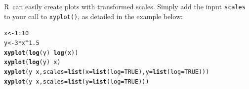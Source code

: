 \documentclass[twoside]{book}\usepackage[]{graphicx}\usepackage[]{xcolor}
\makeatletter
\newcommand{\hlnum}[1]{\textcolor[rgb]{0.686,0.059,0.569}{#1}}%
\newcommand{\hlopt}[1]{\textcolor[rgb]{0,0,0}{#1}}%
\newcommand{\hlstd}[1]{\textcolor[rgb]{0.345,0.345,0.345}{#1}}%
\newcommand{\hlkwb}[1]{\textcolor[rgb]{0.69,0.353,0.396}{#1}}%
\newcommand{\hlkwc}[1]{\textcolor[rgb]{0.333,0.667,0.333}{#1}}%
\newcommand{\hlkwd}[1]{\textcolor[rgb]{0.737,0.353,0.396}{\textbf{#1}}}%
\newenvironment{kframe}{%
 \def\at@end@of@kframe{}%
 \ifinner\ifhmode%
  \def\at@end@of@kframe{\end{minipage}}%
  \begin{minipage}{\columnwidth}%
 \fi\fi%
 \def\FrameCommand##1{\hskip\@totalleftmargin \hskip-\fboxsep
 \colorbox{shadecolor}{##1}\hskip-\fboxsep
     \hskip-\linewidth \hskip-\@totalleftmargin \hskip\columnwidth}%
 \MakeFramed {\advance\hsize-\width
   \@totalleftmargin\z@ \linewidth\hsize
   \@setminipage}}%
 {\par\unskip\endMakeFramed%
 \at@end@of@kframe}
\newenvironment{knitrout}{}{} %
\def\R{{\sf R}}
\newcounter{example}[section]
\makeatother
\begin{document}
\R\ can easily create plots with transformed scales.  Simply add the input \texttt{scales} to your call to \texttt{xyplot()}, as detailed in the example below:
\begin{knitrout}
\color{fgcolor}\begin{kframe}
\begin{alltt}
\hlstd{x} \hlkwb{<-} \hlnum{1}\hlopt{:}\hlnum{10}
\hlstd{y} \hlkwb{<-} \hlnum{3} \hlopt{*} \hlstd{x}\hlopt{^}\hlnum{1.5}
\hlkwd{xyplot}\hlstd{(}\hlkwd{log}\hlstd{(y)} \hlopt{~} \hlkwd{log}\hlstd{(x))}
\hlkwd{xyplot}\hlstd{(}\hlkwd{log}\hlstd{(y)} \hlopt{~} \hlstd{x)}
\hlkwd{xyplot}\hlstd{(y} \hlopt{~} \hlstd{x,} \hlkwc{scales} \hlstd{=} \hlkwd{list}\hlstd{(}\hlkwc{x} \hlstd{=} \hlkwd{list}\hlstd{(}\hlkwc{log} \hlstd{=} \hlnum{TRUE}\hlstd{),} \hlkwc{y} \hlstd{=} \hlkwd{list}\hlstd{(}\hlkwc{log} \hlstd{=} \hlnum{TRUE}\hlstd{)))}
\hlkwd{xyplot}\hlstd{(y} \hlopt{~} \hlstd{x,} \hlkwc{scales} \hlstd{=} \hlkwd{list}\hlstd{(}\hlkwc{y} \hlstd{=} \hlkwd{list}\hlstd{(}\hlkwc{log} \hlstd{=} \hlnum{TRUE}\hlstd{)))}
\end{alltt}
\end{kframe}


\end{knitrout}
\end{document}

